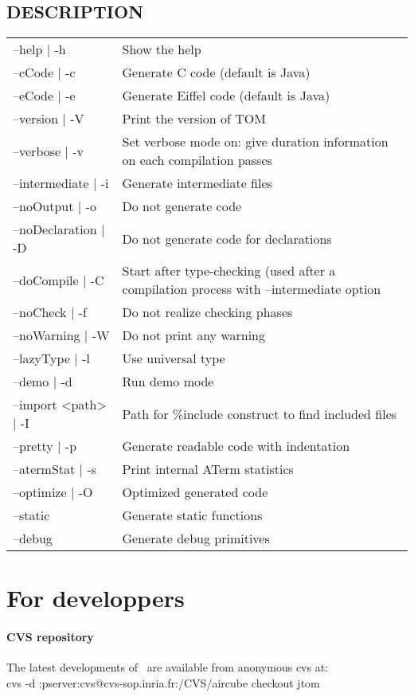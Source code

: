 \subsection{DESCRIPTION}
\begin{tabular}{|l|l|}
\hline
--help | -h&            Show the help \\
--cCode | -c&           Generate C code (default is Java)\\
--eCode | -e&           Generate Eiffel code (default is Java)\\
--version | -V&         Print the version of TOM\\
--verbose | -v&         Set verbose mode on: give duration information
on each compilation passes\\
--intermediate | -i&    Generate intermediate files \\
--noOutput | -o&        Do not generate code \\
--noDeclaration | -D&   Do not generate code for declarations \\
--doCompile | -C&       Start after type-checking (used after a
compilation process with --intermediate option\\
--noCheck | -f&         Do not realize checking phases \\
--noWarning | -W&       Do not print any warning \\
--lazyType | -l&        Use universal type \\
--demo | -d&            Run demo mode \\
--import <path> | -I&   Path for \%include construct to find included files\\
--pretty | -p&          Generate readable code with indentation \\
--atermStat | -s&       Print internal ATerm statistics \\
--optimize | -O&        Optimized generated code \\
--static&               Generate static functions \\
--debug&                Generate debug primitives \\
\hline
\end{tabular}


\section{For developpers}
\paragraph{CVS repository}
The latest developments of \TOM\ are available from anonymous cvs at:
\\cvs -d :pserver:cvs@cvs-sop.inria.fr:/CVS/aircube checkout jtom
